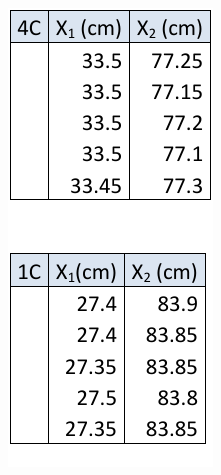 \documentclass{scrreprt}
\begin{document}
\begin{figure}[H]
\begin{subfigure}[b]{0.3\textwidth}
                \includegraphics[width=\textwidth]{diag/one_lens.pdf}

\end{subfigure}
\end{figure}
\end{document}
